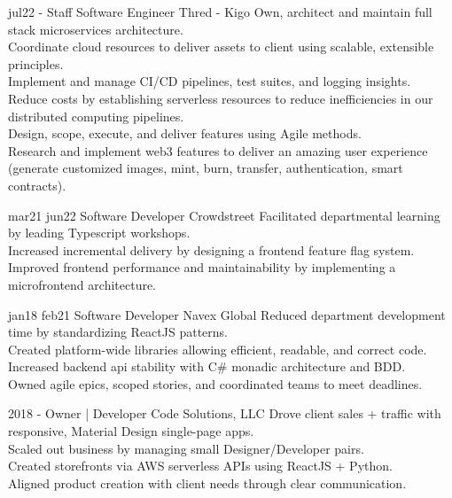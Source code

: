 \documentclass[]{friggeri-cv}
\begin{document}
\begin{entrylist}
  \entry
    {jul22 -}
    {Staff Software Engineer}
    {Thred - Kigo}
    {
      Own, architect and maintain full stack microservices architecture. \\
      Coordinate cloud resources to deliver assets to client using scalable, extensible principles. \\
      Implement and manage CI/CD pipelines, test suites, and logging insights. \\
      Reduce costs by establishing serverless resources to reduce inefficiencies in our distributed computing pipelines. \\
      Design, scope, execute, and deliver features using Agile methods. \\
      Research and implement web3 features to deliver an amazing user experience (generate customized images, mint, burn, transfer, authentication, smart contracts). 
    }


  \entry 
    {mar21 jun22}
    {Software Developer}
    {Crowdstreet}
    {
    Facilitated departmental learning by leading Typescript workshops.\\
    Increased incremental delivery by designing a frontend feature flag system. \\
    Improved frontend performance and maintainability by implementing a microfrontend architecture.\\
    }
  

  \entry 
    {jan18 feb21}
    {Software Developer}
    {Navex Global}
    {
    Reduced department development time by standardizing ReactJS patterns.\\
    Created platform-wide libraries allowing efficient, readable, and correct code.\\
    Increased backend api stability with C\# monadic architecture and BDD.\\
    Owned agile epics, scoped stories, and coordinated teams to meet deadlines.
    }
  
  \entry 
    {2018 - }
    {Owner | Developer}
    {Code Solutions, LLC}
    {
    Drove client sales + traffic with responsive, Material Design single-page apps. \\
    Scaled out business by managing small Designer/Developer pairs.\\
    Created storefronts via AWS serverless APIs using ReactJS + Python. \\
    Aligned product creation with client needs through clear communication.}

\end{entrylist}
\end{document}
